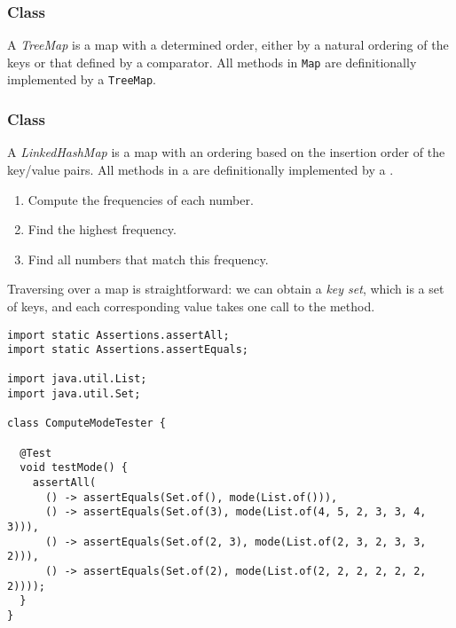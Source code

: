 \subsubsection*{ Class}
A \emph{TreeMap} is a map with a determined order, either by a natural ordering of the keys or that defined by a comparator. All methods in \texttt{Map} are definitionally implemented by a \texttt{TreeMap}.

\subsubsection*{ Class}
A \emph{LinkedHashMap} is a map with an ordering based on the insertion order of the key/value pairs. All methods in a  are definitionally implemented by a .

\begin{enumerate}
  \item Compute the frequencies of each number.
  \item Find the highest frequency.
  \item Find all numbers that match this frequency.
\end{enumerate}


Traversing over a map is straightforward: we can obtain a \emph{key set}, which is a set of keys, and each corresponding value takes one call to the  method.

\begin{lstlisting}[language=MyJava]
import static Assertions.assertAll;
import static Assertions.assertEquals;

import java.util.List;
import java.util.Set;

class ComputeModeTester {

  @Test
  void testMode() {
    assertAll(
      () -> assertEquals(Set.of(), mode(List.of())),  
      () -> assertEquals(Set.of(3), mode(List.of(4, 5, 2, 3, 3, 4, 3))),
      () -> assertEquals(Set.of(2, 3), mode(List.of(2, 3, 2, 3, 3, 2))),
      () -> assertEquals(Set.of(2), mode(List.of(2, 2, 2, 2, 2, 2, 2))));
  }
}
\end{lstlisting}


